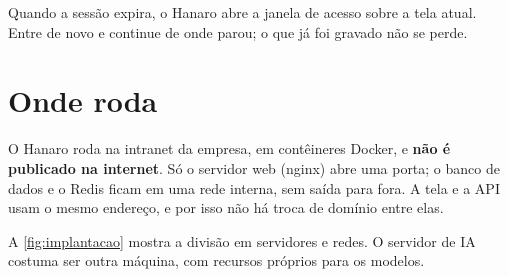 \begin{remark}
Quando a sessão expira, o Hanaro abre a janela de acesso sobre a tela atual. Entre
de novo e continue de onde parou; o que já foi gravado não se perde.
\end{remark}


\section{Onde roda}

O Hanaro roda na intranet da empresa, em contêineres Docker, e \textbf{não é publicado
na internet}. Só o servidor web (nginx) abre uma porta; o banco de dados e o Redis
ficam em uma rede interna, sem saída para fora. A tela e a API usam o mesmo endereço, e
por isso não há troca de domínio entre elas.

A \autoref{fig:implantacao} mostra a divisão em servidores e redes. O servidor de IA
costuma ser outra máquina, com recursos próprios para os modelos.

